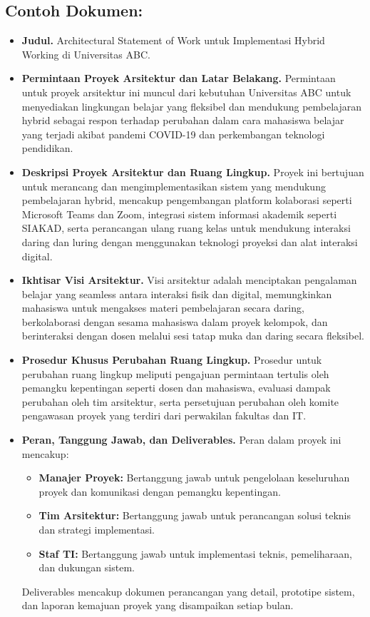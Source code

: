 \subsection*{Contoh Dokumen:}
\begin{itemize}
	\item \textbf{Judul.} 
	Architectural Statement of Work untuk Implementasi Hybrid Working di Universitas ABC.
	
	\item \textbf{Permintaan Proyek Arsitektur dan Latar Belakang.} 
	Permintaan untuk proyek arsitektur ini muncul dari kebutuhan Universitas ABC untuk menyediakan lingkungan belajar yang fleksibel dan mendukung pembelajaran hybrid sebagai respon terhadap perubahan dalam cara mahasiswa belajar yang terjadi akibat pandemi COVID-19 dan perkembangan teknologi pendidikan.
	
	\item \textbf{Deskripsi Proyek Arsitektur dan Ruang Lingkup.} 
	Proyek ini bertujuan untuk merancang dan mengimplementasikan sistem yang mendukung pembelajaran hybrid, mencakup pengembangan platform kolaborasi seperti Microsoft Teams dan Zoom, integrasi sistem informasi akademik seperti SIAKAD, serta perancangan ulang ruang kelas untuk mendukung interaksi daring dan luring dengan menggunakan teknologi proyeksi dan alat interaksi digital.
	
	\item \textbf{Ikhtisar Visi Arsitektur.} 
	Visi arsitektur adalah menciptakan pengalaman belajar yang seamless antara interaksi fisik dan digital, memungkinkan mahasiswa untuk mengakses materi pembelajaran secara daring, berkolaborasi dengan sesama mahasiswa dalam proyek kelompok, dan berinteraksi dengan dosen melalui sesi tatap muka dan daring secara fleksibel.
	
	\item \textbf{Prosedur Khusus Perubahan Ruang Lingkup.} 
	Prosedur untuk perubahan ruang lingkup meliputi pengajuan permintaan tertulis oleh pemangku kepentingan seperti dosen dan mahasiswa, evaluasi dampak perubahan oleh tim arsitektur, serta persetujuan perubahan oleh komite pengawasan proyek yang terdiri dari perwakilan fakultas dan IT.
	
	\item \textbf{Peran, Tanggung Jawab, dan Deliverables.} 
	Peran dalam proyek ini mencakup:
	\begin{itemize}
		\item \textbf{Manajer Proyek:} Bertanggung jawab untuk pengelolaan keseluruhan proyek dan komunikasi dengan pemangku kepentingan.
		\item \textbf{Tim Arsitektur:} Bertanggung jawab untuk perancangan solusi teknis dan strategi implementasi.
		\item \textbf{Staf TI:} Bertanggung jawab untuk implementasi teknis, pemeliharaan, dan dukungan sistem.
	\end{itemize}
	Deliverables mencakup dokumen perancangan yang detail, prototipe sistem, dan laporan kemajuan proyek yang disampaikan setiap bulan.
	

\end{itemize}
